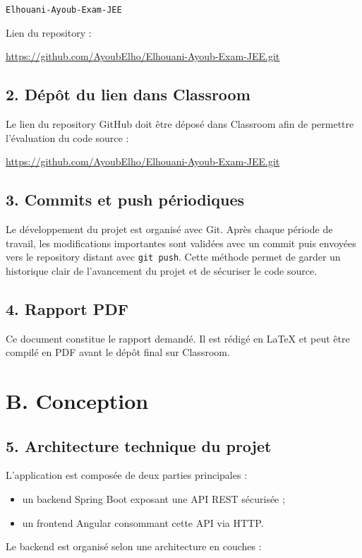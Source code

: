 \documentclass[12pt,a4paper]{article}
\newcommand{\code}[1]{\texttt{#1}}
\newcommand{\question}[1]{\subsection*{#1}}
\begin{document}
\begin{center}
    \code{Elhouani-Ayoub-Exam-JEE}
\end{center}

Lien du repository :

\begin{center}
    \url{https://github.com/AyoubElho/Elhouani-Ayoub-Exam-JEE.git}
\end{center}

\question{2. Dépôt du lien dans Classroom}

Le lien du repository GitHub doit être déposé dans Classroom afin de permettre l'évaluation du code source :

\begin{center}
    \url{https://github.com/AyoubElho/Elhouani-Ayoub-Exam-JEE.git}
\end{center}

\question{3. Commits et push périodiques}

Le développement du projet est organisé avec Git.
Après chaque période de travail, les modifications importantes sont validées avec un commit puis envoyées vers le repository distant avec \code{git push}.
Cette méthode permet de garder un historique clair de l'avancement du projet et de sécuriser le code source.

\question{4. Rapport PDF}

Ce document constitue le rapport demandé.
Il est rédigé en LaTeX et peut être compilé en PDF avant le dépôt final sur Classroom.

\section{B. Conception}

\question{5. Architecture technique du projet}

L'application est composée de deux parties principales :

\begin{itemize}
    \item un backend Spring Boot exposant une API REST sécurisée ;
    \item un frontend Angular consommant cette API via HTTP.
\end{itemize}

Le backend est organisé selon une architecture en couches :
\end{document}
